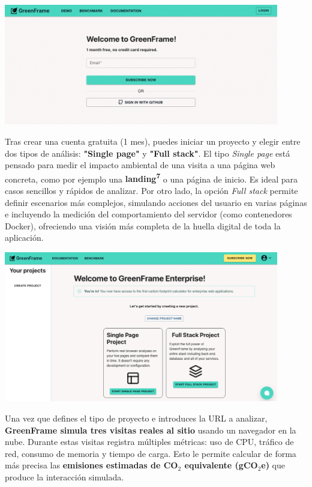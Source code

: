\documentclass[12pt,a4paper]{report}
\begin{document}
\begin{center}
    \includegraphics[width=0.9\textwidth]{imagenes/Greenframe_1.png}
\end{center}

Tras crear una cuenta gratuita (1 mes), puedes iniciar un proyecto y elegir entre dos tipos de análisis: \textbf{"Single page"} y \textbf{"Full stack"}. El tipo \textit{Single page} está pensado para medir el impacto ambiental de una visita a una página web concreta, como por ejemplo una \textbf{landing\textsuperscript{7}} o una página de inicio. Es ideal para casos sencillos y rápidos de analizar. Por otro lado, la opción \textit{Full stack} permite definir escenarios más complejos, simulando acciones del usuario en varias páginas e incluyendo la medición del comportamiento del servidor (como contenedores Docker), ofreciendo una visión más completa de la huella digital de toda la aplicación.

\begin{center}
    \includegraphics[width=0.9\textwidth]{imagenes/Greenframe_2.png}
\end{center}

Una vez que defines el tipo de proyecto e introduces la URL a analizar, \textbf{GreenFrame simula tres visitas reales al sitio} usando un navegador en la nube. Durante estas visitas registra múltiples métricas: uso de CPU, tráfico de red, consumo de memoria y tiempo de carga. Esto le permite calcular de forma más precisa las \textbf{emisiones estimadas de CO$_2$ equivalente (gCO$_2$e)} que produce la interacción simulada.
\end{document}
